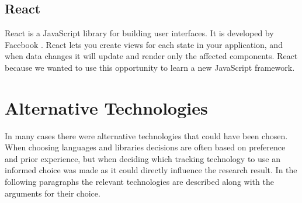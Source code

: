 \documentclass[../Main/thesis.tex]{subfiles}
\begin{document}
\subsection{React}
React is a JavaScript library for building user interfaces.
It is developed by Facebook \citep{FacebookInc.2014}.
React lets you create views for each state in your application, and when data changes it will update and render only the affected components.
React because we wanted to use this opportunity to learn a new JavaScript framework.

\section{Alternative Technologies}
In many cases there were alternative technologies that could have been chosen.
When choosing languages and libraries decisions are often based on preference and prior experience, but when deciding which tracking technology to use an informed choice was made as it could directly influence the research result.
In the following paragraphs the relevant technologies are described along with the arguments for their choice.
\end{document}
